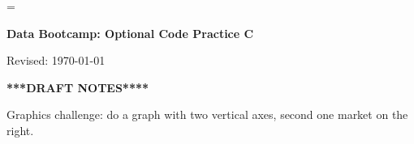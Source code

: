 \documentclass[11pt]{article}
\begin{document}
\parskip=\bigskipamount
\parindent=0.0in
\thispagestyle{empty}


\bigskip\bigskip
\centerline{\Large \bf Data Bootcamp:  Optional Code Practice C}
\centerline{Revised: \today}


\bigskip
\centerline{\bf ****DRAFT NOTES****}


\bigskip 
Graphics challenge:
do a graph with two vertical axes, second one market on the right.
\end{document}

